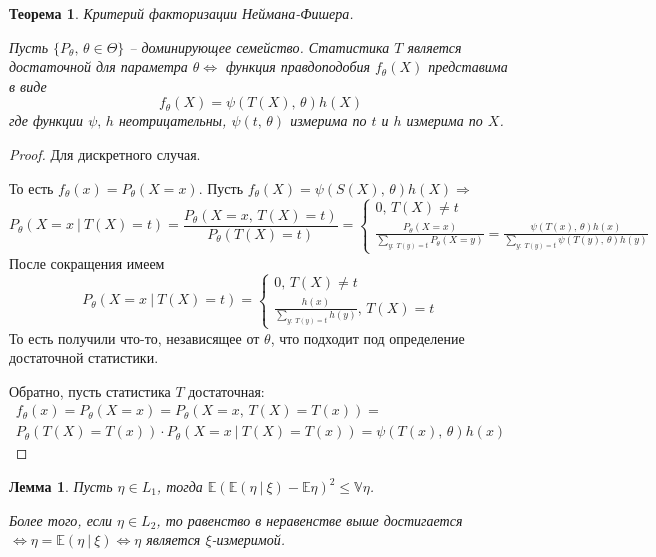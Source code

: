 \documentclass[a4paper,12pt]{article}
\renewcommand{\leq}{\ensuremath{\leqslant}}
\theoremstyle{plain}
\newtheorem{theorem}{Теорема}[section]
\newtheorem{lemma}{Лемма}[section]
\theoremstyle{definition}
\theoremstyle{remark}
\begin{document}
\begin{theorem}
  Критерий факторизации Неймана-Фишера.

  Пусть $\{P_\theta,\, \theta \in \Theta\}$ -- доминирующее семейство. Статистика $T$ является достаточной для параметра $\theta \Leftrightarrow$ функция правдоподобия $f_\theta(X)$ представима в виде
  \[
    f_\theta(X) = \psi(T(X),\, \theta)h(X)
  \]
  где функции $\psi,\, h$ неотрицательны, $\psi(t,\, \theta)$ измерима по $t$ и $h$ измерима по $X$.
\end{theorem}

\begin{proof}
  Для дискретного случая.

  То есть $f_\theta(x) = P_\theta(X = x)$. Пусть $f_\theta(X) = \psi(S(X),\, \theta)h(X) \Rightarrow$
  \[
    P_\theta(X = x \:\vert\: T(X) = t) = \frac{P_\theta(X = x,\, T(X) = t)}{P_\theta(T(X) = t)} = \begin{cases}
      0,\, T(X) \neq t\\
      \frac{P_\theta(X = x)}{\sum_{y :\: T(y) = t}P_\theta(X = y)} = \frac{\psi(T(x),\, \theta)h(x)}{\sum_{y :\: T(y) = t} \psi(T(y),\, \theta)h(y)}
    \end{cases} 
  \]
  После сокращения имеем
  \[
    P_\theta(X = x \:\vert\: T(X) = t) = \begin{cases}
      0,\, T(X) \neq t\\
      \frac{h(x)}{\sum_{y :\: T(y) = t} h(y)},\, T(X) = t
    \end{cases}
  \]
  То есть получили что-то, независящее от $\theta$, что подходит под определение достаточной статистики.

  Обратно, пусть статистика $T$ достаточная:
  \begin{align*}
    f_\theta(x) = P_\theta(X = x) = P_\theta(X = x,\, T(X) = T(x)) =\\ 
    P_\theta(T(X) = T(x))\cdot P_\theta(X = x \:\vert\: T(X) = T(x)) = \psi(T(x),\, \theta)h(x)
  \end{align*}
\end{proof}

\begin{lemma}\label{UMO_uneq}
  Пусть $\eta \in L_1$, тогда $\mathbb{E}(\mathbb{E}(\eta \:\vert\: \xi) - \mathbb{E}\eta)^2 \leq \mathbb{V}\eta$.

  Более того, если $\eta \in L_2$, то равенство в неравенстве выше достигается $\Leftrightarrow \eta = \mathbb{E}(\eta\:\vert\: \xi) \Leftrightarrow \eta$ является $\xi$-измеримой.
\end{lemma}
\end{document}
